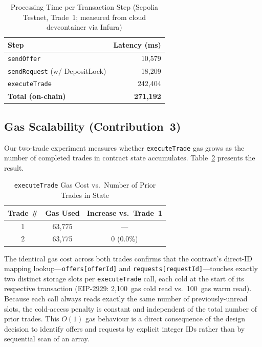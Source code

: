 \documentclass{IEEEoj}
\begin{document}
\begin{table}[t]
\caption{Processing Time per Transaction Step (Sepolia Testnet, Trade~1;
         measured from cloud devcontainer via Infura)}
\label{tab:latency}
\centering
\begin{tabular}{lr}
\toprule
\textbf{Step} & \textbf{Latency (ms)} \\
\midrule
\texttt{sendOffer}                    &  10,579 \\
\texttt{sendRequest} (w/ DepositLock) &  18,209 \\
\texttt{executeTrade}                 & 242,404 \\
\midrule
\textbf{Total (on-chain)}             & \textbf{271,192} \\
\bottomrule
\end{tabular}
\end{table}

\subsection{Gas Scalability (Contribution~3)}

Our two-trade experiment measures whether \texttt{executeTrade} gas grows as
the number of completed trades in contract state accumulates.
Table~\ref{tab:scale} presents the result.

\begin{table}[t]
\caption{\texttt{executeTrade} Gas Cost vs.\ Number of Prior Trades in State}
\label{tab:scale}
\centering
\begin{tabular}{ccc}
\toprule
\textbf{Trade \#} & \textbf{Gas Used} & \textbf{Increase vs.\ Trade~1} \\
\midrule
1 & 63,775  & --- \\
2 & 63,775  & 0 (0.0\%) \\
\bottomrule
\end{tabular}
\end{table}

The identical gas cost across both trades confirms that the contract's
direct-ID mapping lookup---\texttt{offers[offerId]} and
\texttt{requests[requestId]}---touches exactly two distinct storage slots
per \texttt{executeTrade} call, each cold at the start of its respective
transaction (EIP-2929: 2,100~gas cold read vs.\ 100~gas warm read).
Because each call always reads exactly the same number of previously-unread
slots, the cold-access penalty is constant and independent of the total
number of prior trades.
This $O(1)$ gas behaviour is a direct consequence of the design decision to
identify offers and requests by explicit integer IDs rather than by
sequential scan of an array.
\end{document}
